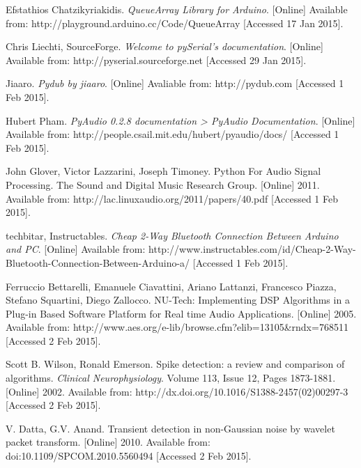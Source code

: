 \begin{thebibliography}{99}
    Efstathios Chatzikyriakidis. \emph{QueueArray Library for Arduino}. [Online] Available from: http://playground.arduino.cc/Code/QueueArray [Accessed 17 Jan 2015].

    Chris Liechti, SourceForge. \emph{Welcome to pySerial's documentation}. [Online] Available from: http://pyserial.sourceforge.net [Accessed 29 Jan 2015].

    Jiaaro. \emph{Pydub by jiaaro}. [Online] Avaliable from: http://pydub.com [Accessed 1 Feb 2015].

    Hubert Pham. \emph{PyAudio 0.2.8 documentation > PyAudio Documentation}. [Online] Available from: http://people.csail.mit.edu/hubert/pyaudio/docs/ [Accessed 1 Feb 2015].
    
    
    John Glover, Victor Lazzarini, Joseph Timoney. Python For Audio Signal Processing. The Sound and Digital Music Research Group. [Online] 2011. Available from: http://lac.linuxaudio.org/2011/papers/40.pdf [Accessed 1 Feb 2015].

    techbitar, Instructables. \emph{Cheap 2-Way Bluetooth Connection Between Arduino and PC}. [Online] Available from: http://www.instructables.com/id/Cheap-2-Way-Bluetooth-Connection-Between-Arduino-a/ [Accessed 1 Feb 2015].

    Ferruccio Bettarelli, Emanuele Ciavattini, Ariano Lattanzi, Francesco Piazza, Stefano Squartini, Diego Zallocco. NU-Tech: Implementing DSP Algorithms in a Plug-in Based Software Platform for Real time Audio Applications. [Online] 2005. Available from: http://www.aes.org/e-lib/browse.cfm?elib=13105\&rndx=768511 [Accessed 2 Feb 2015].

    Scott B. Wilson, Ronald Emerson. Spike detection: a review and comparison of algorithms. \emph{Clinical Neurophysiology}. Volume 113, Issue 12, Pages 1873-1881. [Online] 2002. Available from: http://dx.doi.org/10.1016/S1388-2457(02)00297-3 [Accessed 2 Feb 2015].
    
    V. Datta, G.V. Anand. Transient detection in non-Gaussian noise by wavelet packet transform. [Online] 2010. Available from: doi:10.1109/SPCOM.2010.5560494 [Accessed 2 Feb 2015].






\end{thebibliography}
